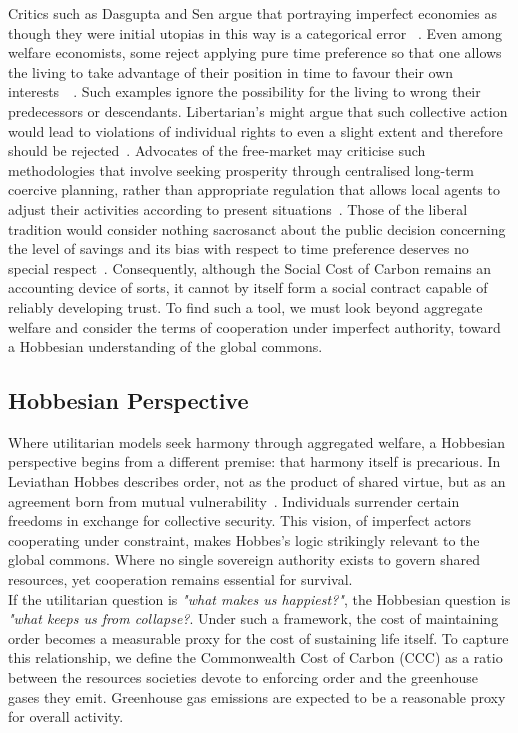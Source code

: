 \documentclass[12pt, oneside]{article}   	%
\begin{document}
Critics such as Dasgupta and Sen argue that portraying imperfect economies as though they were initial utopias in this way is a categorical error ~\cite{as1}.
Even among welfare economists, some reject applying pure time preference so that one allows the living to take advantage of their position in time to favour their own interests~\cite{hs1}~\cite{fr1}.
Such examples ignore the possibility for the living to wrong their predecessors or descendants.
Libertarian's might argue that such collective action would lead to violations of individual rights to even a slight extent and therefore should be rejected~\cite{rn1}.
Advocates of the free-market may criticise such methodologies that involve seeking prosperity through centralised long-term coercive planning, rather than appropriate regulation that allows local agents to adjust their activities according to present situations~\cite{fh1}.
Those of the liberal tradition would consider nothing sacrosanct about the public decision concerning the level of savings and its bias with respect to time preference deserves no special respect~\cite{jr1}.
Consequently, although the Social Cost of Carbon remains an accounting device of sorts, it cannot by itself form a social contract capable of reliably developing trust.
To find such a tool, we must look beyond aggregate welfare and consider the terms of cooperation under imperfect authority, toward a Hobbesian understanding of the global commons.\\

\subsection{Hobbesian Perspective}

Where utilitarian models seek harmony through aggregated welfare, a Hobbesian perspective begins from a different premise: that harmony itself is precarious.
In Leviathan Hobbes describes order, not as the product of shared virtue, but as an agreement born from mutual vulnerability~\cite{th1}.
Individuals surrender certain freedoms in exchange for collective security.
This vision, of imperfect actors cooperating under constraint, makes Hobbes’s logic strikingly relevant to the global commons.
Where no single sovereign authority exists to govern shared resources, yet cooperation remains essential for survival.\\

If the utilitarian question is \emph{"what makes us happiest?"}, the Hobbesian question is \emph{"what keeps us from collapse?}.
Under such a framework, the cost of maintaining order becomes a measurable proxy for the cost of sustaining life itself.
To capture this relationship, we define the Commonwealth Cost of Carbon (CCC) as a ratio between the resources societies devote to enforcing order and the greenhouse gases they emit.
Greenhouse gas emissions are expected to be a reasonable proxy for overall activity.\\
\end{document}
